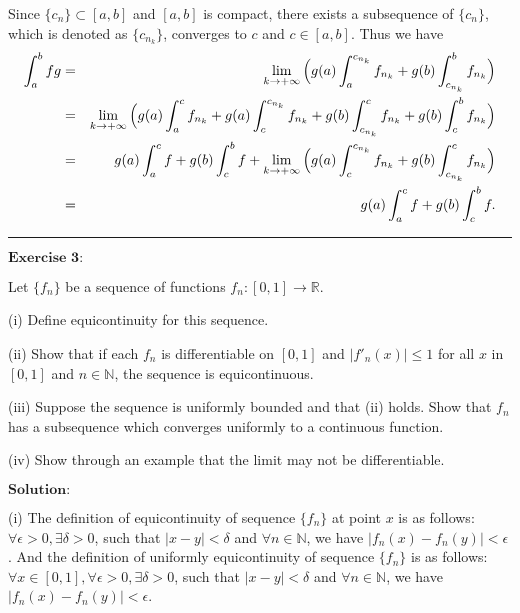 \documentclass[12pt]{article}
\begin{document}
Since $\{c_{n}\} \subset [a, b]$ and $[a, b]$ is compact, there exists a subsequence of $\{c_{n}\}$, which is denoted as $\{c_{n_{k}}\}$, converges to $c$ and $c \in [a, b]$. Thus we have
\begin{eqnarray*}
\int_{a}^{b} f g & = & \lim_{k \to + \infty} \Big{(} g(a) \int_{a}^{c_{n_{k}}} f_{n_{k}} + g(b) \int_{c_{n_{k}}}^{b} f_{n_{k}} \Big{)} \\
& = & \lim_{k \to + \infty} \Big{(} g(a) \int_{a}^{c} f_{n_{k}} + g(a) \int_{c}^{c_{n_{k}}} f_{n_{k}} + g(b) \int_{c_{n_{k}}}^{c} f_{n_{k}} + g(b) \int_{c}^{b} f_{n_{k}} \Big{)} \\
& = &  g(a) \int_{a}^{c} f + g(b) \int_{c}^{b} f + \lim_{k \to + \infty} \Big{(} g(a) \int_{c}^{c_{n_{k}}} f_{n_{k}} +  g(b) \int_{c_{n_{k}}}^{c} f_{n_{k}} \Big{)} \\
& = & g(a) \int_{a}^{c} f + g(b) \int_{c}^{b} f.
\end{eqnarray*}

\noindent\rule[0.25\baselineskip]{\textwidth}{0.5pt}

\vspace{8pt}

$\textbf{Exercise 3:}$

Let $\{f_{n}\}$ be a sequence of functions $f_{n}: [0, 1] \rightarrow \mathbb{R}$.

(i) Define equicontinuity for this sequence.

(ii) Show that if each $f_{n}$ is differentiable on $[0, 1]$ and $|f'_{n}(x)| \leq 1$ for all $x$ in $[0, 1]$ and $n \in \mathbb{N}$, the sequence is equicontinuous.

(iii) Suppose the sequence is uniformly bounded and that (ii) holds. Show that $f_{n}$ has a subsequence which converges uniformly to a continuous function.

(iv) Show through an example that the limit may not be differentiable.

\vspace{8pt}
$\textbf{Solution:}$

(i) The definition of equicontinuity of sequence $\{f_{n}\}$ at point $x$ is as follows: $\forall \epsilon > 0, \exists \delta > 0$, such that $|x - y| < \delta$ and $\forall n \in \mathbb{N}$, we have $|f_{n}(x) - f_{n}(y)| < \epsilon$. And the definition of uniformly equicontinuity of sequence $\{f_{n}\}$ is as follows:
 $\forall x \in [0, 1], \forall \epsilon > 0, \exists \delta > 0$, such that $|x - y| < \delta$ and $\forall n \in \mathbb{N}$, we have $|f_{n}(x) - f_{n}(y)| < \epsilon$.
\end{document}
